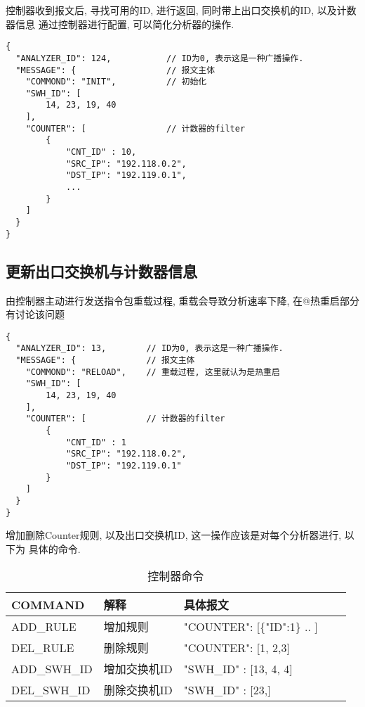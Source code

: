 控制器收到报文后, 寻找可用的ID, 进行返回, 同时带上出口交换机的ID, 以及计数器信息
通过控制器进行配置, 可以简化分析器的操作.

\begin{lstlisting}
{
  "ANALYZER_ID": 124,           // ID为0, 表示这是一种广播操作.
  "MESSAGE": {                  // 报文主体
    "COMMOND": "INIT",          // 初始化
    "SWH_ID": [
        14, 23, 19, 40
    ],
    "COUNTER": [                // 计数器的filter
        {
            "CNT_ID" : 10,
            "SRC_IP": "192.118.0.2",
            "DST_IP": "192.119.0.1",
            ...
        }
    ]
  }
}
\end{lstlisting}

\subsection{更新出口交换机与计数器信息}

由控制器主动进行发送指令包重载过程, 重载会导致分析速率下降,
在@热重启部分有讨论该问题

\begin{lstlisting}
{
  "ANALYZER_ID": 13,        // ID为0, 表示这是一种广播操作.
  "MESSAGE": {              // 报文主体
    "COMMOND": "RELOAD",    // 重载过程, 这里就认为是热重启
    "SWH_ID": [
        14, 23, 19, 40
    ],
    "COUNTER": [            // 计数器的filter
        {
            "CNT_ID" : 1
            "SRC_IP": "192.118.0.2",
            "DST_IP": "192.119.0.1"
        }
    ]
  }
}
\end{lstlisting}

增加删除Counter规则, 以及出口交换机ID, 这一操作应该是对每个分析器进行, 以下为
具体的命令.


\begin{table}[]
    \centering
    \caption{控制器命令}
    \label{tbl:message}
    \begin{tabular}{lllll}
    COMMAND      & 解释         & 具体报文                         \\ \hline
    ADD\_RULE    & 增加规则     & "COUNTER": {[}\{"ID":1\} .. {]}  \\
    DEL\_RULE    & 删除规则     & "COUNTER": {[}1, 2,3{]}          \\
    ADD\_SWH\_ID & 增加交换机ID & "SWH\_ID" : {[}13, 4, 4{]}       \\
    DEL\_SWH\_ID & 删除交换机ID & "SWH\_ID" : {[}23,{]}            \\ \hline
    \end{tabular}
\end{table}

